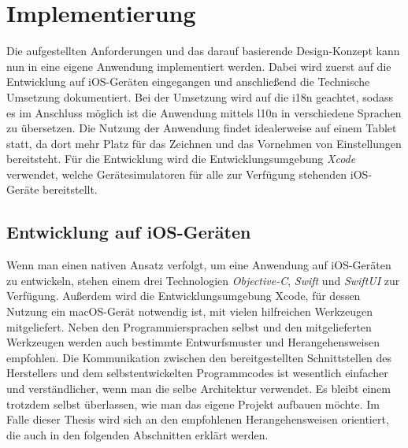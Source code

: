 \chapter{Implementierung}
\label{ch:implementation}
Die aufgestellten Anforderungen und das darauf basierende Design-Konzept kann nun in eine eigene Anwendung implementiert werden.
Dabei wird zuerst auf die Entwicklung auf iOS-Geräten eingegangen und anschließend die Technische Umsetzung dokumentiert.
Bei der Umsetzung wird auf die \Gls{i18n} geachtet, sodass es im Anschluss möglich ist die Anwendung mittels \Gls{l10n} in verschiedene Sprachen zu übersetzen.\pbreak%
%
Die Nutzung der Anwendung findet idealerweise auf einem Tablet statt, da dort mehr Platz für das Zeichnen und das Vornehmen von Einstellungen bereitsteht.
Für die Entwicklung wird die Entwicklungsumgebung \textit{Xcode} verwendet, welche Gerätesimulatoren für alle zur Verfügung stehenden iOS-Geräte bereitstellt.

\section{Entwicklung auf iOS-Geräten}
\label{sec:devios}
Wenn man einen nativen Ansatz verfolgt, um eine Anwendung auf iOS-Geräten zu entwickeln, stehen einem drei Technologien \textit{Objective-C}, \textit{Swift} und \textit{SwiftUI} zur Verfügung.
Außerdem wird die Entwicklungsumgebung Xcode, für dessen Nutzung ein macOS-Gerät notwendig ist, mit vielen hilfreichen Werkzeugen mitgeliefert.\pbreak%
%
Neben den Programmiersprachen selbst und den mitgelieferten Werkzeugen werden auch bestimmte Entwurfsmuster und Herangehensweisen empfohlen.
Die Kommunikation zwischen den bereitgestellten Schnittstellen des Herstellers und dem selbstentwickelten Programmcodes ist wesentlich einfacher und verständlicher, wenn man die selbe Architektur verwendet.
Es bleibt einem trotzdem selbst überlassen, wie man das eigene Projekt aufbauen möchte.
Im Falle dieser Thesis wird sich an den empfohlenen Herangehensweisen orientiert, die auch in den folgenden Abschnitten erklärt werden.

